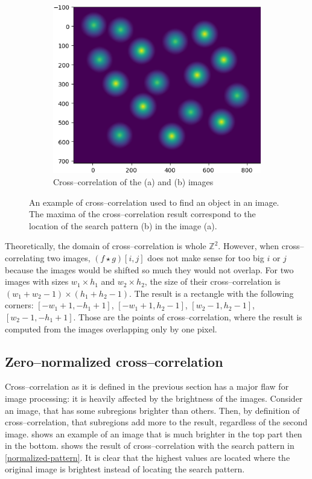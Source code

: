 \begin{figure}
\begin{subfigure}{.5\textwidth}
		\centering
		\includegraphics[width=\linewidth]{img/shapes_correlated}
		\caption{Cross--correlation of the (a) and (b) images}
		\label{2d-correlation-example-result}
	\end{subfigure}
	
	\caption{An example of cross--correlation used to find an object in an image. The maxima of the cross--correlation result correspond to the location of the search pattern (b) in the image (a).}
	\label{2d-correlation-example}
\end{figure}

Theoretically, the domain of cross--correlation is whole $\mathbb{Z}^2$. However, when cross--correlating two images, $(f \star g)[i,j]$ does not make sense for too big $i$ or $j$ because the images would be shifted so much they would not overlap. For two images with sizes $w_1 \times h_1$ and $w_2 \times h_2$, the size of their cross--correlation is $(w_1 + w_2 - 1) \times (h_1 + h_2 - 1)$. The result is a rectangle with the following corners: $[-w_1+1,-h_1+1]$, $[-w_1+1,h_2-1]$, $[w_2-1,h_2-1]$, $[w_2-1,-h_1+1]$. Those are the points of cross--correlation, where the result is computed from the images overlapping only by one pixel.

\subsection{Zero--normalized cross--correlation}

Cross--correlation as it is defined in the previous section has a major flaw for image processing: it is heavily affected by the brightness of the images. Consider an image, that has some subregions brighter than others. Then, by definition of cross--correlation, that subregions add more to the result, regardless of the second image.  shows an example of an image that is much brighter in the top part then in the bottom.  shows the result of cross--correlation with the search pattern in \cref{normalized-pattern}. It is clear that the highest values are located where the original image is brightest instead of locating the search pattern.

